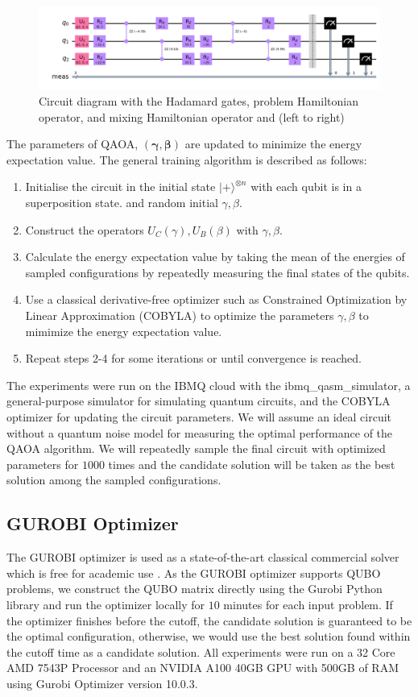\begin{figure}[h!]
    \centering
    \includegraphics[width=1\linewidth]{images/qiskit_circuit.png}
    \caption{Circuit diagram with the Hadamard gates, problem Hamiltonian operator, and mixing Hamiltonian operator and  (left to right)}
    \label{qiskitcircuit}
\end{figure}

The parameters of QAOA, $(\boldsymbol{\gamma}, \boldsymbol{\beta})$ are updated to minimize the energy expectation value. The general training algorithm is described as follows:
\begin{enumerate}
    \item Initialise the circuit in the initial state $| + \rangle^{\otimes n}$ with each qubit is in a superposition state. and random initial $\gamma, \beta$. 
    \item Construct the operators $U_C(\gamma), U_B(\beta)$ with $\gamma, \beta$.
    \item Calculate the energy expectation value by taking the mean of the  energies of sampled configurations by repeatedly measuring the final states of the qubits.
    \item Use a classical derivative-free optimizer such as Constrained Optimization by Linear Approximation (COBYLA) to optimize the parameters $\gamma, \beta$ to mimimize the energy expectation value.
    \item Repeat steps 2-4 for some iterations or until convergence is reached.
\end{enumerate}
The experiments were run on the IBMQ cloud with the ibmq\_qasm\_simulator, a general-purpose simulator for simulating quantum circuits, and the COBYLA optimizer for updating the circuit parameters. We will assume an ideal circuit without a quantum noise model for measuring the optimal performance of the QAOA algorithm. We will repeatedly sample the final circuit with optimized parameters for $1000$ times and the candidate solution will be taken as the best solution among the sampled configurations.


\subsection{GUROBI Optimizer}
The GUROBI optimizer is used as a state-of-the-art classical commercial solver which is free for academic use \cite{b26}. As the GUROBI optimizer supports QUBO problems, we construct the QUBO matrix directly using the Gurobi Python library and run the optimizer locally for $10$ minutes for each input problem. If the optimizer finishes before the cutoff, the candidate solution is guaranteed to be the optimal configuration, otherwise, we would use the best solution found within the cutoff time as a candidate solution. All experiments were run on a 32 Core AMD 7543P Processor and an NVIDIA A100 40GB GPU with 500GB of RAM using Gurobi Optimizer version 10.0.3.

